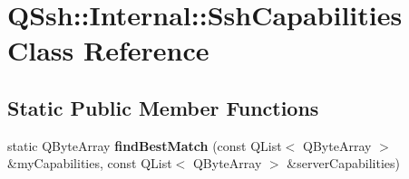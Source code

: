\hypertarget{class_q_ssh_1_1_internal_1_1_ssh_capabilities}{}\section{Q\+Ssh\+:\+:Internal\+:\+:Ssh\+Capabilities Class Reference}
\label{class_q_ssh_1_1_internal_1_1_ssh_capabilities}
\subsection*{Static Public Member Functions}
\begin{DoxyCompactItemize}
\item 
\mbox{\label{class_q_ssh_1_1_internal_1_1_ssh_capabilities_a0146877ff8bbc7f6a62680be611ad6d4}} 
static Q\+Byte\+Array {\bfseries find\+Best\+Match} (const Q\+List$<$ Q\+Byte\+Array $>$ \&my\+Capabilities, const Q\+List$<$ Q\+Byte\+Array $>$ \&server\+Capabilities)
\end{DoxyCompactItemize}
